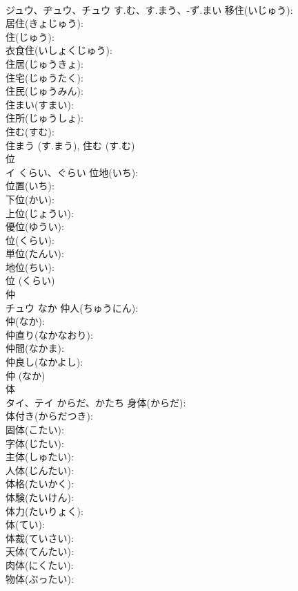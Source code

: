 \documentclass[8pt]{extreport}
\begin{document}
\begin{CJK}{UTF8}{min}
\\	ジュウ、ヂュウ、チュウ	す.む、す.まう、-ず.まい	移住(いじゅう): 
\\	居住(きょじゅう): 
\\	住(じゅう): 
\\	衣食住(いしょくじゅう): 
\\	住居(じゅうきょ): 
\\	住宅(じゅうたく): 
\\	住民(じゅうみん): 
\\	住まい(すまい): 
\\	住所(じゅうしょ): 
\\	住む(すむ): 
\\	住まう (す.まう), 住む (す.む)
\\	位			
\\	イ	くらい、ぐらい	位地(いち): 
\\	位置(いち): 
\\	下位(かい): 
\\	上位(じょうい): 
\\	優位(ゆうい): 
\\	位(くらい): 
\\	単位(たんい): 
\\	地位(ちい): 
\\	位 (くらい)
\\	仲			
\\	チュウ	なか	仲人(ちゅうにん): 
\\	仲(なか): 
\\	仲直り(なかなおり): 
\\	仲間(なかま): 
\\	仲良し(なかよし): 
\\	仲 (なか)
\\	体			
\\	タイ、テイ	からだ、かたち	身体(からだ): 
\\	体付き(からだつき): 
\\	固体(こたい): 
\\	字体(じたい): 
\\	主体(しゅたい): 
\\	人体(じんたい): 
\\	体格(たいかく): 
\\	体験(たいけん): 
\\	体力(たいりょく): 
\\	体(てい): 
\\	体裁(ていさい): 
\\	天体(てんたい): 
\\	肉体(にくたい): 
\\	物体(ぶったい): 

\end{CJK}
\end{document}
